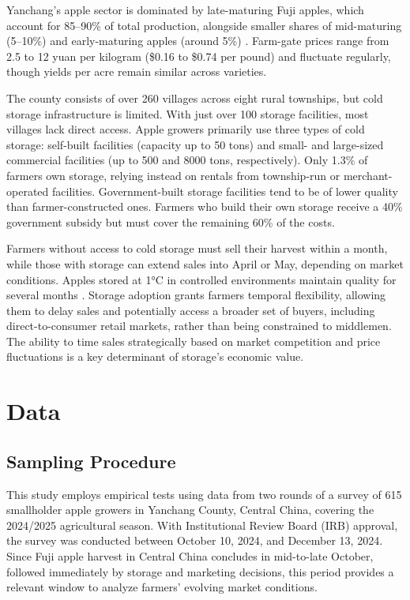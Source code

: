 Yanchang's apple sector is dominated by late-maturing Fuji apples, which account for 85–90\% of total production, alongside smaller shares of mid-maturing (5–10\%) and early-maturing apples (around 5\%) \citep{yanchang2023}. Farm-gate prices range from 2.5 to 12 yuan per kilogram (\$0.16 to \$0.74 per pound) and fluctuate regularly, though yields per acre remain similar across varieties.  

The county consists of over 260 villages across eight rural townships, but cold storage infrastructure is limited. With just over 100 storage facilities, most villages lack direct access. Apple growers primarily use three types of cold storage: self-built facilities (capacity up to 50 tons) and small- and large-sized commercial facilities (up to 500 and 8000 tons, respectively). Only 1.3\% of farmers own storage, relying instead on rentals from township-run or merchant-operated facilities. Government-built storage facilities tend to be of lower quality than farmer-constructed ones. Farmers who build their own storage receive a 40\% government subsidy but must cover the remaining 60\% of the costs.  

Farmers without access to cold storage must sell their harvest within a month, while those with storage can extend sales into April or May, depending on market conditions. Apples stored at 1°C in controlled environments maintain quality for several months \citep{Varela2005Shelf-life, Echeverría2004Relationships}. Storage adoption grants farmers temporal flexibility, allowing them to delay sales and potentially access a broader set of buyers, including direct-to-consumer retail markets, rather than being constrained to middlemen. The ability to time sales strategically based on market competition and price fluctuations is a key determinant of storage's economic value.  



\section{Data}
\subsection{Sampling Procedure}
\noindent This study employs empirical tests using data from two rounds of a survey of 615 smallholder apple growers in Yanchang County, Central China, covering the 2024/2025 agricultural season. With Institutional Review Board (IRB) approval, the survey was conducted between October 10, 2024, and December 13, 2024. Since Fuji apple harvest in Central China concludes in mid-to-late October, followed immediately by storage and marketing decisions, this period provides a relevant window to analyze farmers' evolving market conditions.  


